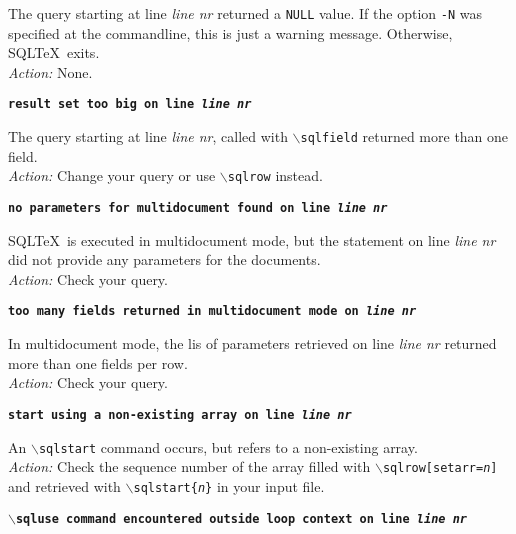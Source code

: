 \documentclass{article}
\newcommand{\bs}{\ensuremath{\backslash}}
\newcommand{\vs}{\vspace{3mm}}
\begin{document}
\noindent The query starting at line \textit{line nr} returned a \texttt{NULL} value. If the
option \texttt{-N} was specified at the commandline, this is just a warning message.
Otherwise, SQL\TeX\ exits. \\
\textit{Action:} None.

\vs

\noindent\textbf{\texttt{result set too big on line \textit{line nr}}}

\vspace{1mm}

\noindent The query starting at line \textit{line nr}, called with \texttt{\bs sqlfield} returned more than one field. \\
\textit{Action:} Change your query or use \texttt{\bs sqlrow} instead.

\vs

\noindent\textbf{\texttt{no parameters for multidocument found on line \textit{line nr}}}

\vspace{1mm}

\noindent SQL\TeX\ is executed in multidocument mode, but the statement on line
\textit{line nr} did not provide any parameters for the documents. \\
\textit{Action:} Check your query.

\vs

\noindent\textbf{\texttt{too many fields returned in multidocument mode on \textit{line nr}}}

\vspace{1mm}

\noindent In multidocument mode, the lis of parameters retrieved on line
\textit{line nr} returned more than one fields per row. \\
\textit{Action:} Check your query.

\vs

\noindent\textbf{\texttt{start using a non-existing array on line \textit{line nr}}}

\vspace{1mm}

\noindent An \texttt{\bs sqlstart} command occurs, but refers to a non-existing array. \\
\textit{Action:} Check the sequence number of the array filled with \texttt{\bs sqlrow[setarr=\textit{n}]} and retrieved with \texttt{\bs sqlstart\{\textit{n}\}} in your input file.

\vs

\noindent\textbf{\texttt{\bs sqluse command encountered outside loop context on line \textit{line nr}}}
\end{document}
